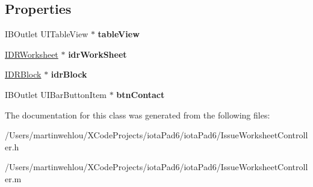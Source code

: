 \subsection*{Properties}
\begin{DoxyCompactItemize}
\item 
\hypertarget{interface_issue_worksheet_controller_a8f7c28b5bf0c0153e305a5fb2ea32fe2}{
IBOutlet UITableView $\ast$ {\bfseries tableView}}
\label{interface_issue_worksheet_controller_a8f7c28b5bf0c0153e305a5fb2ea32fe2}

\item 
\hypertarget{interface_issue_worksheet_controller_a40991730ce97eea6c07a0b08e2d8a13c}{
\hyperlink{interface_i_d_r_worksheet}{IDRWorksheet} $\ast$ {\bfseries idrWorkSheet}}
\label{interface_issue_worksheet_controller_a40991730ce97eea6c07a0b08e2d8a13c}

\item 
\hypertarget{interface_issue_worksheet_controller_a60ca34a0feab92f609dccda35bf8ee24}{
\hyperlink{interface_i_d_r_block}{IDRBlock} $\ast$ {\bfseries idrBlock}}
\label{interface_issue_worksheet_controller_a60ca34a0feab92f609dccda35bf8ee24}

\item 
\hypertarget{interface_issue_worksheet_controller_a1f36ed5b59fa197108ec0df7aadf7a88}{
IBOutlet UIBarButtonItem $\ast$ {\bfseries btnContact}}
\label{interface_issue_worksheet_controller_a1f36ed5b59fa197108ec0df7aadf7a88}

\end{DoxyCompactItemize}


The documentation for this class was generated from the following files:\begin{DoxyCompactItemize}
\item 
/Users/martinwehlou/XCodeProjects/iotaPad6/iotaPad6/IssueWorksheetController.h\item 
/Users/martinwehlou/XCodeProjects/iotaPad6/iotaPad6/IssueWorksheetController.m\end{DoxyCompactItemize}
